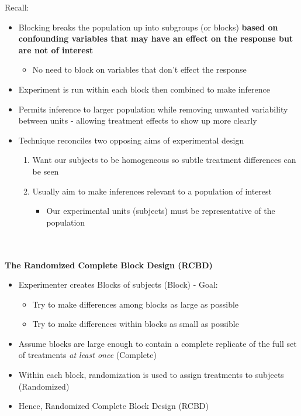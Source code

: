 Recall:
 \begin{itemize}
  \item{Blocking breaks the population up into subgroups (or blocks) \textbf{based on confounding variables that may have an effect on the response but are not of interest}}
        \begin{itemize}
            \item{No need to block on variables that don't effect the response}
        \end{itemize}
        \item{Experiment is run within each block then combined to make inference}
        \item{Permits inference to larger population while removing unwanted variability between units - allowing treatment effects to show up more clearly}
        \item{Technique reconciles two opposing aims of experimental design}
    \begin{enumerate}
        \item{Want our subjects to be homogeneous so subtle treatment differences can be seen}
        \item{Usually aim to make inferences relevant to a population of interest}
        \begin{itemize}
            \item{Our experimental units (subjects) must be representative of the population}
        \end{itemize}
    \end{enumerate}
\end{itemize}		

~\\~\\
\textbf{The Randomized Complete Block Design (RCBD)}
    \begin{itemize}
        \item{Experimenter creates Blocks of subjects (Block) - Goal:}
        \begin{itemize}
            \item{Try to make differences among blocks as large as possible}
            \item{Try to make differences within blocks as small as possible}
        \end{itemize}
        \item{Assume blocks are large enough to contain a complete replicate of the full set of treatments \textit{at least once} (Complete)}
        \item{Within each block, randomization is used to assign treatments to subjects (Randomized)}
        \item{Hence, Randomized Complete Block Design (RCBD)}
    \end{itemize}


